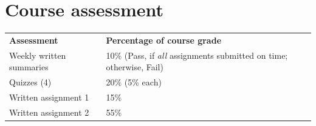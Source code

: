 \documentclass[a4paper, 11pt]{article}
\begin{document}
\section*{Course assessment}

\begin{center}
\begin{tabular}{l l}
\textbf{Assessment} & \textbf{Percentage of course grade} \\
Weekly written summaries & 10\% (Pass, if \emph{all} assignments submitted on time; otherwise, Fail)
  \\
Quizzes (4) & 20\% (5\% each)  \\
Written assignment 1 & 15\% \\
Written assignment 2 & 55\% \\
\end{tabular}
\end{center}
\end{document}
